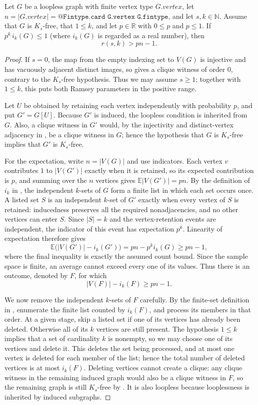 \begin{lemma}
Let $G$ be a loopless graph with finite vertex type $G.vertex$, let
$n=|G.vertex|=\texttt{@Fintype.card G.vertex G.fintype}$, and let $s,k\in\mathbb N$.
Assume that $G$ is $K_s$-free, that $1\leq k$, and let $p\in\mathbb R$
with $0\leq p$ and $p\leq1$.  If
$p^k\,i_k(G)\leq1$ (where $i_k(G)$ is regarded as a real number), then
\[
 r(s,k)>pn-1.
\]
\end{lemma}
\begin{proof}
If $s=0$, the map from the empty indexing set to $V(G)$ is injective and
has vacuously adjacent distinct images, so  gives a
clique witness of order $0$, contrary to the $K_s$-free hypothesis.  Thus we
may assume $s\geq1$; together with $1\leq k$, this puts both Ramsey
parameters in the positive range.

Let $U$ be obtained by retaining each vertex independently with probability
$p$, and put $G'=G[U]$.  Because $G'$ is induced, the loopless condition is
inherited from $G$.  Also, a clique witness in $G'$ would, by the injectivity
and distinct-vertex adjacency in , be a clique witness
in $G$; hence the hypothesis that $G$ is $K_s$-free implies that $G'$ is
$K_s$-free.

For the expectation, write $n=|V(G)|$ and use indicators.  Each vertex
$v$ contributes $1$ to $|V(G')|$ exactly when it is retained, so its expected
contribution is $p$, and summing over the $n$ vertices gives
$\mathbb E|V(G')|=pn$.  By the definition of $i_k$ in
, the independent $k$-sets of $G$ form a finite
list in which each set occurs once.  A listed set $S$ is an independent
$k$-set of $G'$ exactly when every vertex of $S$ is retained: inducedness
preserves all the required nonadjacencies, and no other vertices can enter
$S$.  Since $|S|=k$ and the vertex-retention events are independent, the
indicator of this event has expectation $p^k$.  Linearity of expectation
therefore gives
\[
 \mathbb E\bigl(|V(G')|-i_k(G')\bigr)=pn-p^k i_k(G)\geq pn-1,
\]
where the final inequality is exactly the assumed count bound.  Since the
sample space is finite, an average cannot exceed every one of its values.
Thus there is an outcome, denoted by $F$, for which
\[
 |V(F)|-i_k(F)\geq pn-1.
\]

We now remove the independent $k$-sets of $F$ carefully.  By the finite-set
definition in , enumerate the finite list counted
by $i_k(F)$, and process its members in that order.  At a
given stage, skip a listed set if one of its vertices has already been
deleted.  Otherwise all of its $k$ vertices are still present.  The
hypothesis $1\leq k$ implies that a set of cardinality $k$ is nonempty, so
we may choose one of its vertices and delete it.  This deletes the set being
processed, and at most one vertex is deleted for each member of the list;
hence the total number of deleted vertices is at most $i_k(F)$.  Deleting
vertices cannot create a clique: any clique witness in the remaining induced
graph would also be a clique witness in $F$, so the remaining graph is still
$K_s$-free by .  It is also loopless because looplessness
is inherited by induced subgraphs.


\end{proof}
